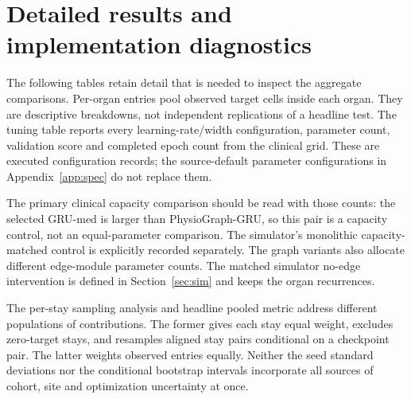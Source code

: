 \appendix

\section{Detailed results and implementation diagnostics}\label{app:diagnostics}
The following tables retain detail that is needed to inspect the aggregate comparisons. Per-organ entries pool observed target cells inside each organ. They are descriptive breakdowns, not independent replications of a headline test. The tuning table reports every learning-rate/width configuration, parameter count, validation score and completed epoch count from the clinical grid. These are executed configuration records; the source-default parameter configurations in Appendix~\ref{app:spec} do not replace them.

The primary clinical capacity comparison should be read with those counts: the selected GRU-med is larger than PhysioGraph-GRU, so this pair is a capacity control, not an equal-parameter comparison. The simulator's monolithic capacity-matched control is explicitly recorded separately. The graph variants also allocate different edge-module parameter counts. The matched simulator no-edge intervention is defined in Section~\ref{sec:sim} and keeps the organ recurrences.

The per-stay sampling analysis and headline pooled metric address different populations of contributions. The former gives each stay equal weight, excludes zero-target stays, and resamples aligned stay pairs conditional on a checkpoint pair. The latter weights observed entries equally. Neither the seed standard deviations nor the conditional bootstrap intervals incorporate all sources of cohort, site and optimization uncertainty at once.

